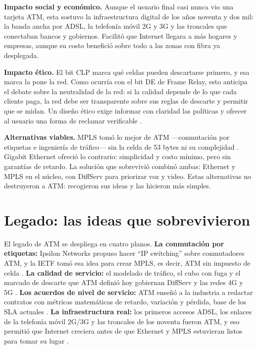 \documentclass[12pt,a4paper]{article}
\begin{document}
\textbf{Impacto social y económico.} Aunque el usuario final casi nunca vio una tarjeta ATM, esta sostuvo la infraestructura digital de los años noventa y dos mil: la banda ancha por ADSL, la telefonía móvil 2G y 3G y las troncales que conectaban bancos y gobiernos. Facilitó que Internet llegara a más hogares y empresas, aunque su costo benefició sobre todo a las zonas con fibra ya desplegada.

\textbf{Impacto ético.} El bit CLP marca qué celdas pueden descartarse primero, y esa marca la pone la red. Como ocurría con el bit DE de Frame Relay, esto anticipa el debate sobre la neutralidad de la red: si la calidad depende de lo que cada cliente paga, la red debe ser transparente sobre sus reglas de descarte y permitir que se midan. Un diseño ético exige informar con claridad las políticas y ofrecer al usuario una forma de reclamar verificable \cite{kurose2017}.

\textbf{Alternativas viables.} MPLS tomó lo mejor de ATM ---conmutación por etiquetas e ingeniería de tráfico--- sin la celda de 53 bytes ni su complejidad \cite{rfc3031}. Gigabit Ethernet ofreció lo contrario: simplicidad y costo mínimo, pero sin garantías de retardo. La solución que sobrevivió combinó ambas: Ethernet y MPLS en el núcleo, con DiffServ para priorizar voz y video. Estas alternativas no destruyeron a ATM: recogieron sus ideas y las hicieron más simples.

\section{Legado: las ideas que sobrevivieron}

El legado de ATM se despliega en cuatro planos. \textbf{La conmutación por etiquetas:} Ipsilon Networks propuso hacer ``IP switching'' sobre conmutadores ATM, y la IETF tomó esa idea para crear MPLS, es decir, ATM sin impuesto de celda \cite{chao2001, rfc3031}. \textbf{La calidad de servicio:} el modelado de tráfico, el cubo con fuga y el marcado de descarte que ATM definió hoy gobiernan DiffServ y las redes 4G y 5G \cite{itui371, kurose2017}. \textbf{Los acuerdos de nivel de servicio:} ATM enseñó a la industria a redactar contratos con métricas matemáticas de retardo, variación y pérdida, base de los SLA actuales \cite{mcdysan1995}. \textbf{La infraestructura real:} los primeros accesos ADSL, los enlaces de la telefonía móvil 2G/3G y las troncales de los noventa fueron ATM, y eso permitió que Internet creciera antes de que Ethernet y MPLS estuvieran listos para tomar su lugar \cite{heinanen1999}.
\end{document}
